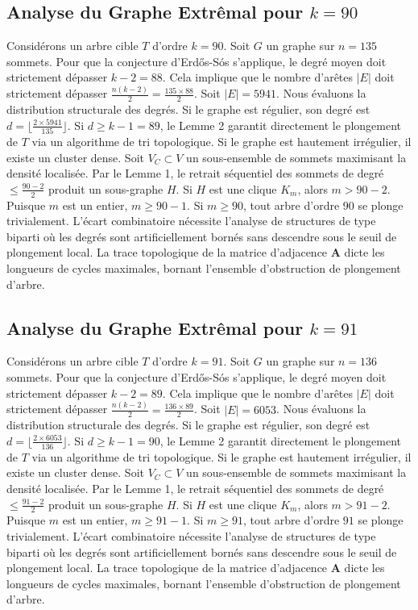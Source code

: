 \documentclass[11pt,a4paper]{article}
\begin{document}
\subsection{Analyse du Graphe Extr\^emal pour $k=90$}
Consid\'erons un arbre cible $T$ d'ordre $k=90$.
Soit $G$ un graphe sur $n=135$ sommets.
Pour que la conjecture d'Erd\H{o}s-S\'os s'applique, le degr\'e moyen doit strictement d\'epasser $k-2 = 88$.
Cela implique que le nombre d'ar\^etes $|E|$ doit strictement d\'epasser $\frac{n(k-2)}{2} = \frac{135 \times 88}{2}$.
Soit $|E| = 5941$.
Nous \'evaluons la distribution structurale des degr\'es. Si le graphe est r\'egulier, son degr\'e est $d = \lfloor \frac{2 \times 5941}{135} \rfloor$.
Si $d \geq k-1 = 89$, le Lemme 2 garantit directement le plongement de $T$ via un algorithme de tri topologique.
Si le graphe est hautement irr\'egulier, il existe un cluster dense. Soit $V_C \subset V$ un sous-ensemble de sommets maximisant la densit\'e localis\'ee.
Par le Lemme 1, le retrait s\'equentiel des sommets de degr\'e $\leq \frac{90-2}{2}$ produit un sous-graphe $H$.
Si $H$ est une clique $K_{m}$, alors $m > 90-2$. Puisque $m$ est un entier, $m \geq 90-1$. Si $m \geq 90$, tout arbre d'ordre $90$ se plonge trivialement.
L'\'ecart combinatoire n\'ecessite l'analyse de structures de type biparti o\`u les degr\'es sont artificiellement born\'es sans descendre sous le seuil de plongement local. La trace topologique de la matrice d'adjacence $\mathbf{A}$ dicte les longueurs de cycles maximales, bornant l'ensemble d'obstruction de plongement d'arbre.


\subsection{Analyse du Graphe Extr\^emal pour $k=91$}
Consid\'erons un arbre cible $T$ d'ordre $k=91$.
Soit $G$ un graphe sur $n=136$ sommets.
Pour que la conjecture d'Erd\H{o}s-S\'os s'applique, le degr\'e moyen doit strictement d\'epasser $k-2 = 89$.
Cela implique que le nombre d'ar\^etes $|E|$ doit strictement d\'epasser $\frac{n(k-2)}{2} = \frac{136 \times 89}{2}$.
Soit $|E| = 6053$.
Nous \'evaluons la distribution structurale des degr\'es. Si le graphe est r\'egulier, son degr\'e est $d = \lfloor \frac{2 \times 6053}{136} \rfloor$.
Si $d \geq k-1 = 90$, le Lemme 2 garantit directement le plongement de $T$ via un algorithme de tri topologique.
Si le graphe est hautement irr\'egulier, il existe un cluster dense. Soit $V_C \subset V$ un sous-ensemble de sommets maximisant la densit\'e localis\'ee.
Par le Lemme 1, le retrait s\'equentiel des sommets de degr\'e $\leq \frac{91-2}{2}$ produit un sous-graphe $H$.
Si $H$ est une clique $K_{m}$, alors $m > 91-2$. Puisque $m$ est un entier, $m \geq 91-1$. Si $m \geq 91$, tout arbre d'ordre $91$ se plonge trivialement.
L'\'ecart combinatoire n\'ecessite l'analyse de structures de type biparti o\`u les degr\'es sont artificiellement born\'es sans descendre sous le seuil de plongement local. La trace topologique de la matrice d'adjacence $\mathbf{A}$ dicte les longueurs de cycles maximales, bornant l'ensemble d'obstruction de plongement d'arbre.
\end{document}

